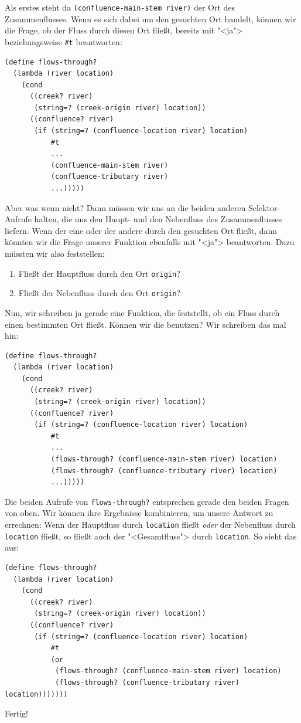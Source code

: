 Als erstes steht da \lstinline{(confluence-main-stem river)} der Ort
des Zusammenflusses.  Wenn es sich dabei um den gesuchten Ort handelt,
können wir die Frage, ob der Fluss durch diesen Ort fließt, bereits
mit "<ja"> beziehungsweise \lstinline{#t} beantworten:
%
\begin{lstlisting}
(define flows-through?
  (lambda (river location)
    (cond
      ((creek? river)
       (string=? (creek-origin river) location))
      ((confluence? river)
       (if (string=? (confluence-location river) location)
           #t
           ...
           (confluence-main-stem river)
           (confluence-tributary river)
           ...)))))
\end{lstlisting}
%
Aber was wenn nicht?  Dann müssen wir uns an die beiden anderen
Selektor-Aufrufe halten, die uns den Haupt- und den Nebenfluss des
Zusammenflusses liefern.  Wenn der eine oder der andere durch den
gesuchten Ort fließt, dann könnten wir die Frage unserer Funktion
ebenfalls mit "<ja"> beantworten.  Dazu müssten wir also feststellen:
%
\begin{enumerate}
\item Fließt der Hauptfluss durch den Ort \lstinline{origin}?
\item Fließt der Nebenfluss durch den Ort \lstinline{origin}?
\end{enumerate}
%
Nun, wir schreiben ja gerade eine Funktion, die feststellt, ob ein
Fluss durch einen bestimmten Ort fließt.  Können wir die benutzen?
Wir schreiben das mal hin:
%
\begin{lstlisting}
(define flows-through?
  (lambda (river location)
    (cond
      ((creek? river)
       (string=? (creek-origin river) location))
      ((confluence? river)
       (if (string=? (confluence-location river) location)
           #t
           ...
           (flows-through? (confluence-main-stem river) location)
           (flows-through? (confluence-tributary river) location)
           ...)))))
\end{lstlisting}
%
Die beiden Aufrufe von \lstinline{flows-through?} entsprechen gerade
den beiden Fragen von oben.  Wir können ihre Ergebnisse kombinieren,
um unsere Antwort zu errechnen: Wenn der Hauptfluss durch
\lstinline{location} fließt \emph{oder} der Nebenfluss durch
\lstinline{location} fließt, so fließt auch der "<Gesamtfluss"> durch
\lstinline{location}.  So sieht das aus:
%
\begin{lstlisting}
(define flows-through?
  (lambda (river location)
    (cond
      ((creek? river)
       (string=? (creek-origin river) location))
      ((confluence? river)
       (if (string=? (confluence-location river) location)
           #t
           (or
            (flows-through? (confluence-main-stem river) location)
            (flows-through? (confluence-tributary river) location)))))))
\end{lstlisting}
%
Fertig!

